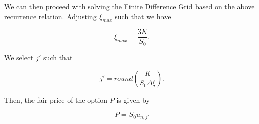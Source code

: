 \documentclass{article}
\begin{document}
We can then proceed with solving the Finite Difference Grid based on the above recurrence relation. Adjusting \(\xi_{max}\) such that we have

\begin{equation}
  \xi_{max} = \frac{3K}{S_0}.
\end{equation}

We select \(j'\) such that

\begin{equation}
  j' = round(\frac{K}{S_0\Delta\xi}).
\end{equation}

Then, the fair price of the option \(P\) is given by

\begin{equation}
  P = S_0 u_{n, j'}
\end{equation}
\end{document}
